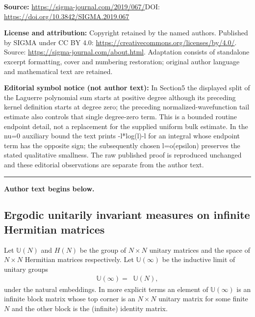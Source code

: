 \documentclass[11pt]{article}
\numberwithin{equation}{section}
\begin{document}
\noindent\textbf{Source:} \url{https://sigma-journal.com/2019/067/}\quad DOI: \url{https://doi.org/10.3842/SIGMA.2019.067}\par
\noindent\textbf{License and attribution:} Copyright retained by the named authors. Published by SIGMA under CC BY 4.0: \url{https://creativecommons.org/licenses/by/4.0/}. Source: \url{https://sigma-journal.com/about.html}. Adaptation consists of standalone excerpt formatting, cover and numbering restoration; original author language and mathematical text are retained.\par
\noindent\textbf{Editorial symbol notice (not author text):} In Section5 the displayed split of the Laguerre polynomial sum starts at positive degree although its preceding kernel definition starts at degree zero; the preceding normalized-wavefunction tail estimate also controls that single degree-zero term. This is a bounded routine endpoint detail, not a replacement for the supplied uniform bulk estimate. In the nu=0 auxiliary bound the text prints -l*log(l)-l for an integral whose endpoint term has the opposite sign; the subsequently chosen l=o(epsilon) preserves the stated qualitative smallness. The raw published proof is reproduced unchanged and these editorial observations are separate from the author text.\par
\medskip\hrule\medskip\noindent\textbf{Author text begins below.}\par
\setcounter{section}{1}
\setcounter{subsection}{1}
\setcounter{subsubsection}{0}
\setcounter{Theorem}{0}
\setcounter{equation}{0}
\subsection{Ergodic unitarily invariant measures on infinite Hermitian matrices}\label{section1.2}

Let $\mathbb{U}(N)$ and $H(N)$ be the group of $N \times N$ unitary matrices and the space of $N \times N$ Hermitian matrices respectively. Let $\mathbb{U}(\infty)$ be the inductive limit of unitary groups
\begin{gather*}
\mathbb{U}(\infty)=\mathop{\underset{\rightarrow}{\lim}}\mathbb{U}(N),
\end{gather*}
 under the natural embeddings. In more explicit terms an element of $\mathbb{U}(\infty)$ is an infinite block matrix whose top corner is an $N\times N$ unitary matrix for some finite $N$ and the other block is the (infinite) identity matrix.
\end{document}
